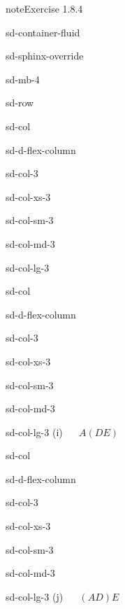 \documentclass[letterpaper,10pt,english]{jupyterBook}
\begin{document}
\begin{sphinxadmonition}{note}{Exercise 1.8.4}
\begin{sphinxuseclass}{sd-container-fluid}
\begin{sphinxuseclass}{sd-sphinx-override}
\begin{sphinxuseclass}{sd-mb-4}
\begin{sphinxuseclass}{sd-row}
\begin{sphinxuseclass}{sd-col}
\begin{sphinxuseclass}{sd-d-flex-column}
\begin{sphinxuseclass}{sd-col-3}
\begin{sphinxuseclass}{sd-col-xs-3}
\begin{sphinxuseclass}{sd-col-sm-3}
\begin{sphinxuseclass}{sd-col-md-3}
\begin{sphinxuseclass}{sd-col-lg-3}
\end{sphinxuseclass}
\end{sphinxuseclass}
\end{sphinxuseclass}
\end{sphinxuseclass}
\end{sphinxuseclass}
\end{sphinxuseclass}
\end{sphinxuseclass}
\begin{sphinxuseclass}{sd-col}
\begin{sphinxuseclass}{sd-d-flex-column}
\begin{sphinxuseclass}{sd-col-3}
\begin{sphinxuseclass}{sd-col-xs-3}
\begin{sphinxuseclass}{sd-col-sm-3}
\begin{sphinxuseclass}{sd-col-md-3}
\begin{sphinxuseclass}{sd-col-lg-3}
\sphinxAtStartPar
(i)    \(A(DE)\)

\end{sphinxuseclass}
\end{sphinxuseclass}
\end{sphinxuseclass}
\end{sphinxuseclass}
\end{sphinxuseclass}
\end{sphinxuseclass}
\end{sphinxuseclass}
\begin{sphinxuseclass}{sd-col}
\begin{sphinxuseclass}{sd-d-flex-column}
\begin{sphinxuseclass}{sd-col-3}
\begin{sphinxuseclass}{sd-col-xs-3}
\begin{sphinxuseclass}{sd-col-sm-3}
\begin{sphinxuseclass}{sd-col-md-3}
\begin{sphinxuseclass}{sd-col-lg-3}
\sphinxAtStartPar
(j)    \((AD)E\)


\end{sphinxuseclass}
\end{sphinxuseclass}
\end{sphinxuseclass}
\end{sphinxuseclass}
\end{sphinxuseclass}
\end{sphinxuseclass}
\end{sphinxuseclass}
\end{sphinxuseclass}
\end{sphinxuseclass}
\end{sphinxuseclass}
\end{sphinxuseclass}
\end{sphinxadmonition}
\end{document}
